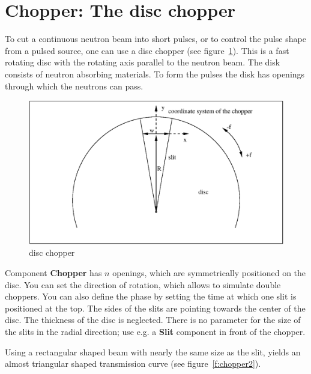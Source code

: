 
\section{Chopper: The disc chopper}
\label{s:chopper}


To cut a continuous neutron beam into short pulses, or to control
the pulse shape from a pulsed source, one can use a disc
chopper (see figure~\ref{f:chopper1}). This is a fast rotating disc with the
rotating axis parallel to the neutron beam. The disk consists of neutron
absorbing materials. To form the pulses the disk has openings through which
the neutrons can pass.

\begin{figure}[ht]
\includegraphics[width=1.0\linewidth]{figures/Chopper.eps}
\caption{disc chopper\label{f:chopper1}}
\end{figure}

Component {\bf Chopper} has $n$ openings, which are
symmetrically positioned on the disc. You can set the direction of
rotation, which allows to simulate double choppers. You can also define
the phase by setting the time at which one slit is positioned at the
top. The sides of the slits are pointing towards the center of the disc.
The thickness of the disc is neglected.  There is no parameter for the
size of the slits in the radial direction; 
use e.g. a {\bf Slit} component in front of the chopper.

Using a rectangular shaped beam with nearly the same
size as the slit, yields an almost triangular shaped
transmission curve (see figure~\ref{f:chopper2}).

